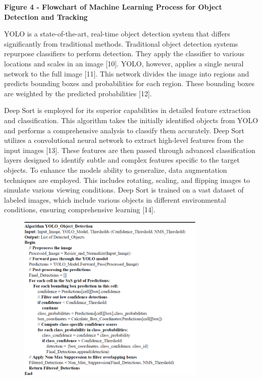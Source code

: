 {\bfseries Figure 4 - Flowchart of Machine Learning Process for Object
Detection and Tracking}

YOLO is a state-of-the-art, real-time object detection system that
differs significantly from traditional methods. Traditional object
detection systems repurpose classifiers to perform detection. They apply
the classifier to various locations and scales in an image {[}10{]}.
YOLO, however, applies a single neural network to the full image
{[}11{]}. This network divides the image into regions and predicts
bounding boxes and probabilities for each region. These bounding boxes
are weighted by the predicted probabilities {[}12{]}.

Deep Sort is employed for its superior capabilities in detailed feature
extraction and classification. This algorithm takes the initially
identified objects from YOLO and performs a comprehensive analysis to
classify them accurately. Deep Sort utilizes a convolutional neural
network to extract high-level features from the input images {[}13{]}.
These features are then passed through advanced classification layers
designed to identify subtle and complex features specific to the target
objects. To enhance the model\textquotesingle s ability to generalize,
data augmentation techniques are employed. This includes rotating,
scaling, and flipping images to simulate various viewing conditions.
Deep Sort is trained on a vast dataset of labeled images, which include
various objects in different environmental conditions, ensuring
comprehensive learning {[}14{]}.

\begin{figure}[H]
	\centering
	\includegraphics[width=0.8\textwidth]{assets/16}
	\caption*{}
\end{figure}


